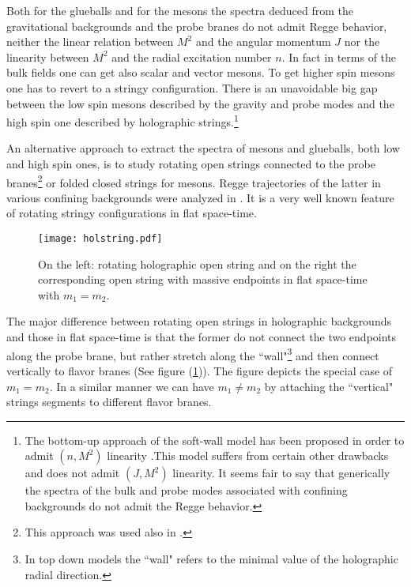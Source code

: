 \documentclass[11pt,a4]{article}
\begin{document}
Both for the  glueballs and for the mesons the spectra deduced from the gravitational backgrounds and the probe branes do not admit Regge behavior, neither the linear relation between $M^2$ and the angular momentum $J$ nor the linearity between $M^2$ and the radial excitation number $n$. In fact in terms of the bulk fields one can get also scalar and vector mesons. To get higher spin mesons one has to revert to a stringy configuration. There is an unavoidable big gap between the low spin mesons described by the gravity and probe modes and the high spin one described by holographic strings\cite{Peeters:2006iu}.\footnote{The bottom-up approach of the soft-wall model has been proposed in order to admit $(n,M^2)$ linearity \cite{oai:arXiv.org:hep-ph/0602229}.This model suffers from certain other drawbacks and does not admit $(J,M^2)$ linearity.  It seems fair to say that generically the spectra of the bulk and probe modes associated with confining backgrounds do not admit the Regge behavior.}


An alternative approach to extract the spectra of mesons and glueballs, both low and high spin ones, is to study rotating open strings connected to the probe branes\footnote{This approach was used also in \cite{Imoto:2010ef}.} or folded closed strings for mesons. Regge trajectories of the latter in various confining backgrounds were analyzed in \cite{oai:arXiv.org:hep-th/0311190}. It is a very well known feature of rotating stringy configurations in flat space-time.

		\begin{figure}[t!] \centering
					\texttt{[image: holstring.pdf]}
					\caption{\label{fig:mapholflat} On the left: rotating holographic open string and on the right the corresponding open string with massive endpoints in flat space-time with $m_1=m_2$.}
		\end{figure}

The major difference between rotating open strings in holographic backgrounds and those in flat space-time is that the former do not connect the two endpoints along the probe brane, but rather stretch along the ``wall"\footnote{In top down models the ``wall" refers to the minimal value of the holographic radial direction.} and then connect vertically to flavor branes (See figure (\ref{fig:mapholflat})). The figure depicts the special case of $m_1=m_2$. In a similar manner we can have $m_1\neq m_2$ by attaching the ``vertical" strings segments to different flavor branes.
\end{document}
